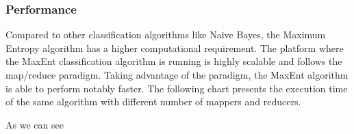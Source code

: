 \subsubsection{Performance}
Compared to other classification algorithms like Naive Bayes, the Maximum Entropy algorithm has a higher computational requirement. 
The platform where the MaxEnt classification algorithm is running is highly scalable and follows the map/reduce paradigm. Taking advantage of the paradigm, the MaxEnt algorithm
is able to perform notably faster.
The following chart presents the execution time of the same algorithm with different number of mappers and reducers.



As we can see


